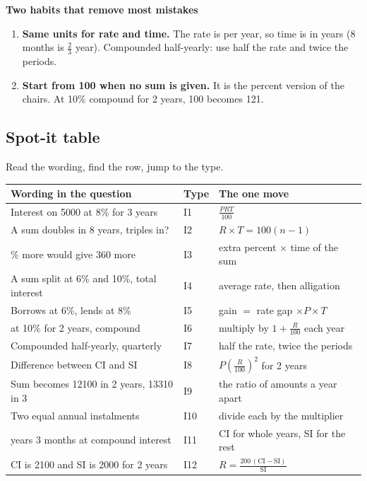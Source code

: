 \documentclass[11pt,a4paper]{article}
\let\oldsubsection\subsection
\renewcommand{\subsection}{\needspace{9\baselineskip}\oldsubsection}
\newcommand{\infobox}[2]{\par\medskip\noindent\begingroup\setlength{\fboxsep}{7pt}%
  \colorbox{codebg}{\parbox{\dimexpr\linewidth-14pt\relax}{\textbf{\color{ember}#1}\par\smallskip #2}}\endgroup\par\medskip}
\begin{document}
\infobox{Two habits that remove most mistakes}{
\begin{enumerate}
\item \textbf{Same units for rate and time.} The rate is per year, so time is in years (8 months is $\tfrac23$ year). Compounded half-yearly: use half the rate and twice the periods.
\item \textbf{Start from 100 when no sum is given.} It is the percent version of the chairs. At 10\% compound for 2 years, 100 becomes 121.
\end{enumerate}}

\subsection*{Spot-it table}
Read the wording, find the row, jump to the type.
\begin{center}\small\renewcommand{\arraystretch}{1.18}\setlength{\tabcolsep}{7pt}
\begin{tabularx}{\linewidth}{@{}>{\raggedright\arraybackslash}X l >{\raggedright\arraybackslash}X@{}}
\toprule
\textbf{\color{slate}Wording in the question} & \textbf{\color{slate}Type} & \textbf{\color{slate}The one move} \\ \midrule
Interest on 5000 at 8\% for 3 years & I1 & $\frac{PRT}{100}$ \\
A sum doubles in 8 years, triples in? & I2 & $R\times T=100(n-1)$ \\
2\% more would give 360 more & I3 & extra percent $\times$ time of the sum \\
A sum split at 6\% and 10\%, total interest & I4 & average rate, then alligation \\
Borrows at 6\%, lends at 8\% & I5 & gain $=$ rate gap $\times P\times T$ \\
10000 at 10\% for 2 years, compound & I6 & multiply by $1+\frac{R}{100}$ each year \\
Compounded half-yearly, quarterly & I7 & half the rate, twice the periods \\
Difference between CI and SI & I8 & $P\left(\frac{R}{100}\right)^2$ for 2 years \\
Sum becomes 12100 in 2 years, 13310 in 3 & I9 & the ratio of amounts a year apart \\
Two equal annual instalments & I10 & divide each by the multiplier \\
2 years 3 months at compound interest & I11 & CI for whole years, SI for the rest \\
CI is 2100 and SI is 2000 for 2 years & I12 & $R=\frac{200\,(\text{CI}-\text{SI})}{\text{SI}}$ \\
\bottomrule
\end{tabularx}\end{center}
\end{document}
